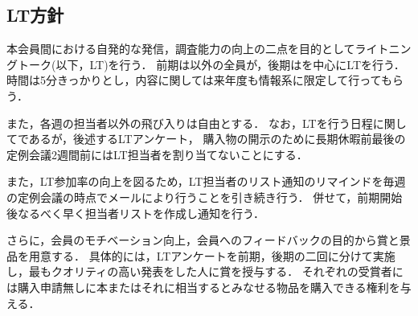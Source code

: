 \subsection*{LT方針}

本会員間における自発的な発信，調査能力の向上の二点を目的としてライトニングトーク(以下，LT)を行う．
前期は\firstGrade{}以外の全員が，後期は\firstGrade{}を中心にLTを行う．時間は5分きっかりとし，内容に関しては来年度も情報系に限定して行ってもらう．

また，各週の担当者以外の飛び入りは自由とする．
なお，LTを行う日程に関してであるが，後述するLTアンケート，
購入物の開示のために長期休暇前最後の定例会議2週間前にはLT担当者を割り当てないことにする．

また，LT参加率の向上を図るため，LT担当者のリスト通知のリマインドを毎週の定例会議の時点でメールにより行うことを引き続き行う．
併せて，前期開始後なるべく早く担当者リストを作成し通知を行う．

さらに，会員のモチベーション向上，会員へのフィードバックの目的から賞と景品を用意する．
具体的には，LTアンケートを前期，後期の二回に分けて実施し，最もクオリティの高い発表をした人に賞を授与する．
それぞれの受賞者には購入申請無しに本またはそれに相当するとみなせる物品を購入できる権利を与える．
